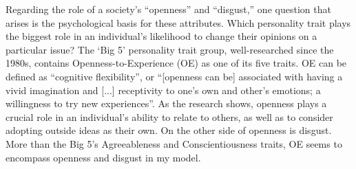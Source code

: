 Regarding the role of a society's ``openness'' and ``disgust,'' one question that arises is the
psychological basis for these attributes. Which personality trait plays the
biggest role in an individual's likelihood to change their opinions on a
particular issue? The `Big 5' personality trait group\cite{john_big-five_1999},
well-researched since the 1980s, contains Openness-to-Experience (OE) as one of
its five traits. OE can be defined as ``cognitive
flexibility''\cite{deyoung_sources_2005}, or ``[openness can be] associated
with having a vivid imagination and [...] receptivity to one's own and other's
emotions; a willingness to try new experiences''\cite{furnham_childhood_2016}.
As the research shows, openness plays a crucial role in an individual's ability
to relate to others, as well as to consider adopting outside ideas as their
own. On the other side of openness is disgust. More than the Big 5's Agreeableness and Conscientiousness traits, OE seems
to encompass openness and disgust in my model.
